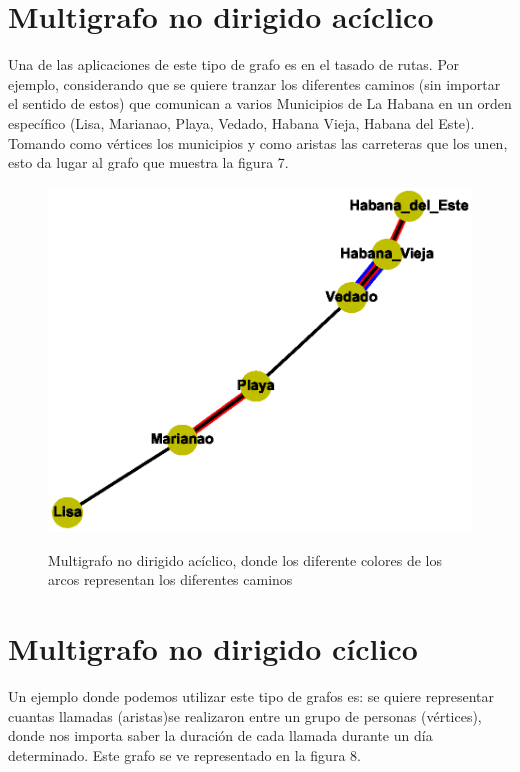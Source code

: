 \documentclass{article}
\begin{document}
 \section{Multigrafo no dirigido acíclico}
Una de las aplicaciones de este tipo de grafo es en el tasado de rutas.
Por ejemplo, considerando que se quiere tranzar los diferentes caminos (sin importar el sentido de estos) que comunican a varios Municipios de La Habana en un orden específico (Lisa, Marianao, Playa, Vedado, Habana Vieja, Habana del Este). Tomando como vértices los municipios y como aristas las carreteras que los unen, esto da lugar al grafo que muestra la figura 7.
\begin{center}

\end{center}
\begin{figure}[h]
\begin{center}
\includegraphics[scale=0.7]{Graf7.eps}\\
\caption{Multigrafo no dirigido acíclico, donde los diferente colores de los arcos representan los diferentes caminos}
\end{center}
\end{figure}
\section{Multigrafo no dirigido cíclico}

Un ejemplo donde podemos utilizar este tipo de grafos es: se quiere representar cuantas llamadas (aristas)se realizaron entre un grupo de personas (vértices), donde nos importa saber la duración de cada llamada durante un día determinado. Este grafo se ve representado en la figura 8.
\end{document}
